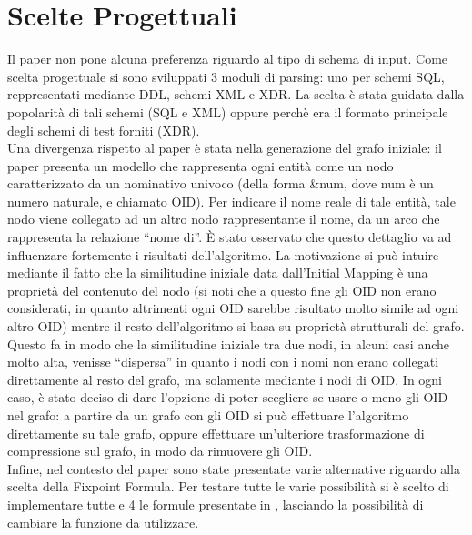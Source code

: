 \documentclass{article}
\begin{document}
\section{Scelte Progettuali}
\label{Scelte Progettuali}

Il paper non pone alcuna preferenza riguardo al tipo di schema di input. Come scelta progettuale si sono sviluppati 3 moduli di parsing: uno per schemi SQL, reppresentati mediante DDL, schemi XML e XDR. La scelta è stata guidata dalla popolarità di tali schemi (SQL e XML) oppure perchè era il formato principale degli schemi di test forniti (XDR).\\

Una divergenza rispetto al paper è stata nella generazione del grafo iniziale: il paper presenta un modello che rappresenta ogni entità come un nodo caratterizzato da un nominativo univoco (della forma \&num, dove num è un numero naturale, e chiamato OID). Per indicare il nome reale di tale entità, tale nodo viene collegato ad un altro nodo rappresentante il nome, da un arco che rappresenta la relazione “nome di”.
È stato osservato che questo dettaglio va ad influenzare fortemente i risultati dell’algoritmo. La motivazione si può intuire mediante il fatto che la similitudine iniziale data dall’Initial Mapping è una proprietà del contenuto del nodo (si noti che a questo fine gli OID non erano considerati, in quanto altrimenti ogni OID sarebbe risultato molto simile ad ogni altro OID) mentre il resto dell’algoritmo si basa su proprietà strutturali del grafo. Questo fa in modo che la similitudine iniziale tra due nodi, in alcuni casi anche molto alta, venisse “dispersa” in quanto i nodi con i nomi non erano collegati direttamente al resto del grafo, ma solamente mediante i nodi di OID.
In ogni caso, è stato deciso di dare l’opzione di poter scegliere se usare o meno gli OID nel grafo: a partire da un grafo con gli OID si può effettuare l’algoritmo direttamente su tale grafo, oppure effettuare un’ulteriore trasformazione di compressione sul grafo, in modo da rimuovere gli OID.\\

Infine, nel contesto del paper sono state presentate varie alternative riguardo alla scelta della Fixpoint Formula. Per testare tutte le varie possibilità si è scelto di implementare tutte e 4 le formule presentate in \citep{sfpaper_ext}, lasciando la possibilità di cambiare la funzione da utilizzare.

\end{document}
